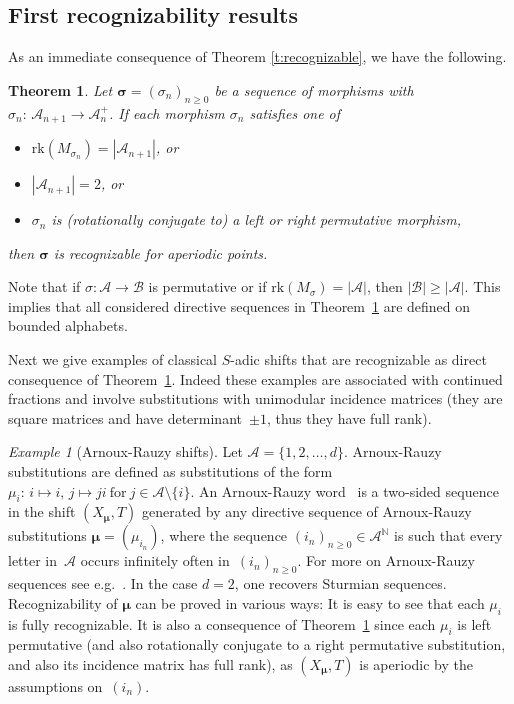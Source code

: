 \documentclass{amsart}
\newtheorem{theorem}[lemma]{Theorem}
\theoremstyle{definition}
\theoremstyle{remark}
\newtheorem{example}[lemma]{Example}
\numberwithin{equation}{section}
\begin{document}
\subsection{First recognizability results}
As an immediate consequence of Theorem \ref{t:recognizable}, we have the following.

\begin{theorem}\label{c:rec}
Let $\boldsymbol{\sigma} = (\sigma_n)_{n\ge0}$ be a sequence of morphisms with $\sigma_n:\, \mathcal{A}_{n+1}\to \mathcal{A}_n^+$.
If each morphism $\sigma_n$ satisfies one of 
\begin{itemize}
\item  $\mathrm{rk}(M_{\sigma_{n}}) = |\mathcal{A}_{n+1}|$, or
\item $|\mathcal{A}_{n+1}| = 2$, or
\item  $\sigma_n$ is (rotationally conjugate to) a left or right permutative morphism,
\end{itemize}
then $\boldsymbol{\sigma}$ is  recognizable for aperiodic points.
\end{theorem}

Note that if $\sigma:\mathcal{A} \rightarrow \mathcal{B}$ is permutative or if $\mathrm{rk}(M_{\sigma}) = |\mathcal{A}|$, then  $|\mathcal{B}|\geq |\mathcal{A}|$. 
This implies that all considered directive sequences in Theorem~\ref{c:rec} are defined on bounded alphabets. 




Next we give examples of classical $S$-adic shifts that are recognizable as direct consequence of Theorem~\ref{c:rec}. Indeed  these examples are associated with continued fractions and involve substitutions with unimodular incidence matrices (they are square matrices and have determinant~$\pm1$, thus they have full rank). 

 
\begin{example}[Arnoux-Rauzy shifts]\label{exa:AR}
Let $\mathcal{A}=\{1,2,\ldots,d\}$. 
Arnoux-Rauzy substitutions are defined as substitutions of the form $\mu_i:\, i \mapsto i,\, j \mapsto ji\ \mbox{for}\ j \in \mathcal{A} \setminus \{i\}$.
An Arnoux-Rauzy word~\cite{Arnoux-Rauzy:91} is a two-sided sequence in the shift $(X_{\boldsymbol{\mu}},T)$ generated by any directive sequence of Arnoux-Rauzy  substitutions $\boldsymbol{\mu}=(\mu_{i_n})$, where the sequence $(i_n)_{n\geq 0} \in \mathcal{A}^\mathbb{N}$ is such that every letter in~$\mathcal{A}$ occurs infinitely often in~$(i_n)_{n\ge0}$. 
For more on Arnoux-Rauzy sequences see e.g.\ \cite{Cassaigne-Ferenczi-Zamboni:00,Cassaigne-Ferenczi-Messaoudi:08}. 
In the case $d=2$, one recovers Sturmian sequences. 
Recognizability of $\boldsymbol{\mu}$ can be proved in various ways: 
It is easy to see that each $\mu_i$ is fully recognizable. 
It is also a consequence of Theorem~\ref{c:rec} since each $\mu_i$ is left permutative (and also rotationally conjugate to a right permutative substitution, and also its incidence matrix has full rank), as $(X_{\boldsymbol{\mu}},T)$ is aperiodic by the assumptions on~$(i_n)$.
\end{example}
\end{document}
